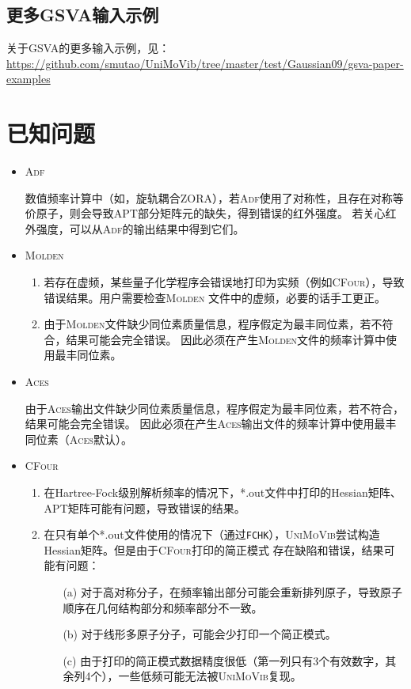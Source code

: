 \documentclass[12pt,a4paper,openany,twoside,cap,UTF8]{ctexbook}
\begin{document}
\section{更多GSVA输入示例 } \label{sec:gsva-more}

关于GSVA的更多输入示例，见： \\
\href{https://github.com/smutao/UniMoVib/tree/master/test/Gaussian09/gsva-paper-examples} {https://github.com/smutao/UniMoVib/tree/master/test/Gaussian09/gsva-paper-examples}

\chapter{已知问题} \label{part:problem}

\begin{itemize}
\item \textsc{Adf}

数值频率计算中（如，旋轨耦合ZORA），若\textsc{Adf}使用了对称性，且存在对称等价原子，则会导致APT部分矩阵元的缺失，得到错误的红外强度。
若关心红外强度，可以从\textsc{Adf}的输出结果中得到它们。

\item \textsc{Molden}

\begin{enumerate}
\item 若存在虚频，某些量子化学程序会错误地打印为实频（例如\textsc{CFour}），导致错误结果。用户需要检查\textsc{Molden}
文件中的虚频，必要的话手工更正。

\item 由于\textsc{Molden}文件缺少同位素质量信息，程序假定为最丰同位素，若不符合，结果可能会完全错误。
因此必须在产生\textsc{Molden}文件的频率计算中使用最丰同位素。
\end{enumerate}

\item \textsc{Aces}

由于\textsc{Aces}输出文件缺少同位素质量信息，程序假定为最丰同位素，若不符合，结果可能会完全错误。
因此必须在产生\textsc{Aces}输出文件的频率计算中使用最丰同位素（\textsc{Aces}默认）。

\item \textsc{CFour}

\begin{enumerate}
\item 在Hartree-Fock级别解析频率的情况下，*.out文件中打印的Hessian矩阵、APT矩阵可能有问题，导致错误的结果。

\item 在只有单个*.out文件使用的情况下（通过\verb|FCHK|），\textsc{UniMoVib}尝试构造Hessian矩阵。但是由于\textsc{CFour}打印的简正模式
存在缺陷和错误，结果可能有问题：
  \begin{itemize}
    \item[(a)] 对于高对称分子，在频率输出部分可能会重新排列原子，导致原子顺序在几何结构部分和频率部分不一致。
    \item[(b)] 对于线形多原子分子，可能会少打印一个简正模式。
    \item[(c)] 由于打印的简正模式数据精度很低（第一列只有3个有效数字，其余列4个），一些低频可能无法被\textsc{UniMoVib}复现。
  \end{itemize}
\end{enumerate}


\end{itemize}
\end{document}
